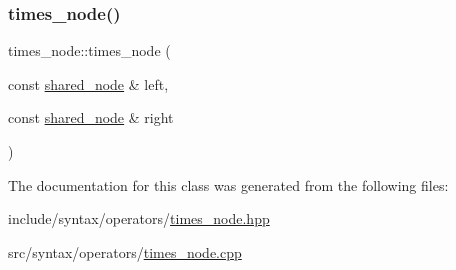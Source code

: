 \subsubsection{\texorpdfstring{times\+\_\+node()}{times\_node()}}
{\footnotesize\ttfamily times\+\_\+node\+::times\+\_\+node (\begin{DoxyParamCaption}\item[{const \hyperlink{namespacejawe_a3f307481d921b6cbb50cc8511fc2b544}{shared\+\_\+node} \&}]{left,  }\item[{const \hyperlink{namespacejawe_a3f307481d921b6cbb50cc8511fc2b544}{shared\+\_\+node} \&}]{right }\end{DoxyParamCaption})}



The documentation for this class was generated from the following files\+:\begin{DoxyCompactItemize}
\item 
include/syntax/operators/\hyperlink{times__node_8hpp}{times\+\_\+node.\+hpp}\item 
src/syntax/operators/\hyperlink{times__node_8cpp}{times\+\_\+node.\+cpp}\end{DoxyCompactItemize}
